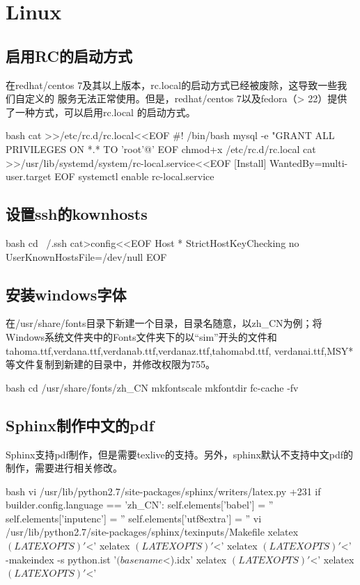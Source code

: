 \chapter{Linux}

\section{启用RC的启动方式}
在redhat/centos 7及其以上版本，rc.local的启动方式已经被废除，这导致一些我们自定义的
服务无法正常使用。但是，redhat/centos 7以及fedora（> 22）提供了一种方式，可以启用rc.local
的启动方式。
\begin{code-block}{bash}
cat >>/etc/rc.d/rc.local<<EOF
#! /bin/bash
mysql -e  "GRANT ALL PRIVILEGES ON *.* TO 'root'@'%
EOF
chmod+x /etc/rc.d/rc.local
cat >>/usr/lib/systemd/system/rc-local.service<<EOF
[Install]
WantedBy=multi-user.target
EOF
systemctl enable rc-local.service
\end{code-block}

\section{设置ssh的kownhosts}
\begin{code-block}{bash}
cd ~/.ssh
cat>config<<EOF
Host *
    StrictHostKeyChecking no
    UserKnownHostsFile=/dev/null
EOF
\end{code-block}

\section{安装windows字体}
在/usr/share/fonts目录下新建一个目录，目录名随意，以zh\_CN为例；将Windows系统文件夹中的Fonts文件夹下的以“sim”开头的文件和tahoma.ttf,verdana.ttf,verdanab.ttf,verdanaz.ttf,tahomabd.ttf,
verdanai.ttf,MSY*等文件复制到新建的目录中，并修改权限为755。
\begin{code-block}{bash}
cd /usr/share/fonts/zh_CN
mkfontscale
mkfontdir
fc-cache -fv
\end{code-block}

\section{Sphinx制作中文的pdf}
Sphinx支持pdf制作，但是需要texlive的支持。另外，sphinx默认不支持中文pdf的制作，需要进行相关修改。
\begin{code-block}{bash}
vi /usr/lib/python2.7/site-packages/sphinx/writers/latex.py +231
            if builder.config.language == 'zh_CN':
                self.elements['babel'] = ''
                self.elements['inputenc'] = ''
                self.elements['utf8extra'] = ''
vi /usr/lib/python2.7/site-packages/sphinx/texinputs/Makefile
        xelatex $(LATEXOPTS) '$<'
        xelatex $(LATEXOPTS) '$<'
        xelatex $(LATEXOPTS) '$<'
        -makeindex -s python.ist '$(basename $<).idx'
        xelatex $(LATEXOPTS) '$<'
        xelatex $(LATEXOPTS) '$<'
\end{code-block}

